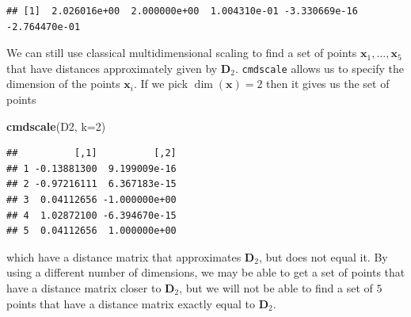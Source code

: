 \documentclass[
]{book}
\newenvironment{Shaded}{\begin{snugshade}}{\end{snugshade}}
\newcommand{\AttributeTok}[1]{\textcolor[rgb]{0.13,0.29,0.53}{#1}}
\newcommand{\DecValTok}[1]{\textcolor[rgb]{0.00,0.00,0.81}{#1}}
\newcommand{\FloatTok}[1]{\textcolor[rgb]{0.00,0.00,0.81}{#1}}
\newcommand{\FunctionTok}[1]{\textcolor[rgb]{0.13,0.29,0.53}{\textbf{#1}}}
\newcommand{\NormalTok}[1]{#1}
\newcommand{\OtherTok}[1]{\textcolor[rgb]{0.56,0.35,0.01}{#1}}
\newcommand{\SpecialCharTok}[1]{\textcolor[rgb]{0.81,0.36,0.00}{\textbf{#1}}}
\theoremstyle{definition}
\theoremstyle{definition}
\theoremstyle{definition}
\theoremstyle{definition}
\theoremstyle{remark}
\begin{document}
\begin{Shaded}
\end{Shaded}

\begin{verbatim}
## [1]  2.026016e+00  2.000000e+00  1.004310e-01 -3.330669e-16 -2.764470e-01
\end{verbatim}

We can still use classical multidimensional scaling to find a set of points \(\mathbf x_1, \ldots, \mathbf x_5\) that have distances approximately given by \(\mathbf D_2\).
\texttt{cmdscale} allows us to specify the dimension of the points \(\mathbf x_i\). If we pick \(\dim(\mathbf x)=2\) then it gives us the set of points

\begin{Shaded}
\begin{Highlighting}[]
\FunctionTok{cmdscale}\NormalTok{(D2, }\AttributeTok{k=}\DecValTok{2}\NormalTok{)}
\end{Highlighting}
\end{Shaded}

\begin{verbatim}
##          [,1]          [,2]
## 1 -0.13881300  9.199009e-16
## 2 -0.97216111  6.367183e-15
## 3  0.04112656 -1.000000e+00
## 4  1.02872100 -6.394670e-15
## 5  0.04112656  1.000000e+00
\end{verbatim}

which have a distance matrix that approximates \(\mathbf D_2\), but does not equal it. By using a different number of dimensions, we may be able to get a set of points that have a distance matrix closer to \(\mathbf D_2\), but we will not be able to find a set of \(5\) points that have a distance matrix exactly equal to \(\mathbf D_2\).
\end{document}

